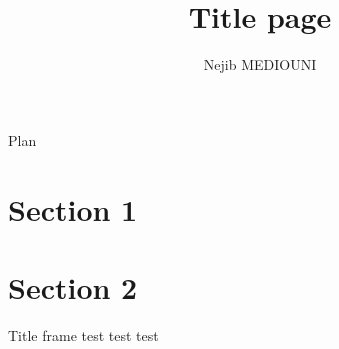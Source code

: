 \documentclass[french]{beamer}
\title[]{Title page}
\author[Jeudi $14$ Juillet $2016$]{Nejib MEDIOUNI}
\date{}
\makeatletter
\let\origtableofcontents=\tableofcontents
\def\tableofcontents{\@ifnextchar[{\origtableofcontents}{\gobbletableofcontents}}
\def\gobbletableofcontents#1{\origtableofcontents}
\makeatother
\begin{document}
\begingroup 
    \begin{frame}
        \titlepage
    \end{frame}
\endgroup

\begingroup 
    \begin{frame}{Plan}
        \tableofcontents{} [pausesections]
    \end{frame}
\endgroup

    \section{Section 1}

    \section{Section 2}
    \begin{frame}{Title frame}  
        test test test
    \end{frame}
\end{document}
